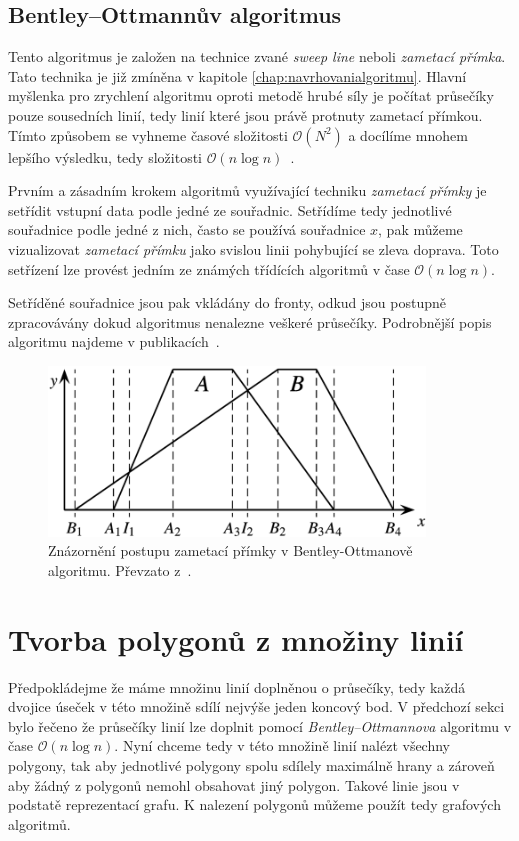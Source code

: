 \subsection{Bentley–Ottmannův algoritmus}
Tento algoritmus je založen na technice zvané \textit{sweep line} neboli \textit{zametací přímka}. Tato technika je již zmíněna v kapitole \ref{chap:navrhovanialgoritmu}. Hlavní myšlenka pro zrychlení algoritmu oproti metodě hrubé síly je počítat průsečíky pouze sousedních linií, tedy linií které jsou právě protnuty zametací přímkou. Tímto způsobem se vyhneme časové složitosti $\mathcal{O}(N^2)$ a docílíme mnohem lepšího výsledku, tedy složitosti $\mathcal{O}(n\log{}n)$~\cite{bentley1979algorithms}.

Prvním a zásadním krokem algoritmů využívající techniku \textit{zametací přímky} je setřídit vstupní data podle jedné ze souřadnic. Setřídíme tedy jednotlivé souřadnice podle jedné z nich, často se používá souřadnice $x$, pak můžeme vizualizovat \textit{zametací přímku} jako svislou linii pohybující se zleva doprava. Toto setřízení lze provést jedním ze známých třídících algoritmů v čase $\mathcal{O}(n\log{}n)$.

	Setříděné souřadnice jsou pak vkládány do fronty, odkud jsou postupně zpracovávány dokud algoritmus nenalezne veškeré průsečíky. Podrobnější popis algoritmu najdeme v publikacích~\cite{coupland, bentley1979algorithms}.
	
\begin{figure}[h]
  \centering
  \includegraphics[width=10cm]{./pictures/5/Bentley-Ottmann-plane-sweep-algorithm.png}
  \caption{Znázornění postupu zametací přímky v Bentley-Ottmanově algoritmu. Převzato z~\citep{coupland}.}
  \label{fig:5-bentley_ottman}
\end{figure}



\section{Tvorba polygonů z množiny linií}
Předpokládejme že máme množinu linií doplněnou o průsečíky, tedy každá dvojice úseček v této množině sdílí nejvýše jeden koncový bod. V předchozí sekci bylo řečeno že průsečíky linií lze doplnit pomocí \textit{Bentley–Ottmannova} algoritmu v čase $\mathcal{O}(n\log{}n)$. Nyní chceme tedy v této množině linií nalézt všechny polygony, tak aby jednotlivé polygony spolu sdílely maximálně hrany a zároveň aby žádný z polygonů nemohl obsahovat jiný polygon. Takové linie jsou v podstatě reprezentací grafu. K nalezení polygonů můžeme použít tedy grafových algoritmů. 
	
